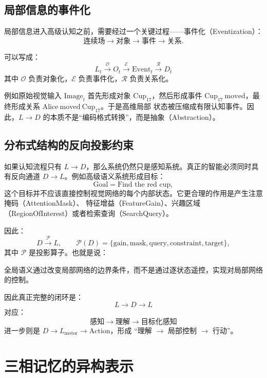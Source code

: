 \subsection{局部信息的事件化}

局部信息进入高级认知之前，需要经过一个关键过程——事件化（Eventization）：
\[
\text{连续场}\rightarrow\text{对象}\rightarrow\text{事件}\rightarrow\text{关系}.
\]

可以写成：
\[
L_t
\xrightarrow{\mathcal O}
O_t
\xrightarrow{\mathcal E}
\mathrm{Event}_t
\xrightarrow{\mathcal R}
D_t
\]
其中 $\mathcal O$ 负责对象化，$\mathcal E$ 负责事件化，$\mathcal R$ 负责关系化。

例如原始视觉输入 $\mathrm{Image}_t$ 首先形成对象 $\mathrm{Cup}_{17}$，然后形成事件
$\mathrm{Cup}_{17}\ \mathrm{moved}$，最终形成关系 $\mathrm{Alice\ moved\ Cup}_{17}$。于是高维局部
状态被压缩成有限认知事件。因此，$L\rightarrow D$ 的本质不是“编码格式转换”，而是抽象（Abstraction）。

\subsection{分布式结构的反向投影约束}

如果认知流程只有 $L\rightarrow D$，那么系统仍然只是感知系统。真正的智能必须同时具有反向通道
$D\rightarrow L$。例如高级语义系统形成目标：
\[
\mathrm{Goal}=\text{Find the red cup},
\]
这个目标并不应该直接控制视觉网络的每个内部状态。它更合理的作用是产生注意掩码（AttentionMask）、
特征增益（FeatureGain）、兴趣区域（RegionOfInterest）或者检索查询（SearchQuery）。

因此：
\[
D\xrightarrow{\mathcal P}L,
\qquad
\mathcal P(D)=\{\mathrm{gain},\mathrm{mask},\mathrm{query},\mathrm{constraint},\mathrm{target}\},
\]
其中 $\mathcal P$ 是投影算子。也就是说：

\begin{statementbox}
全局语义通过改变局部网络的边界条件，而不是通过逐状态遥控，实现对局部网络的控制。
\end{statementbox}

因此真正完整的闭环是：
\[
\boxed{
L\rightarrow D\rightarrow L
}
\]
对应：
\[
\boxed{
\text{感知}\rightarrow\text{理解}\rightarrow\text{目标化感知}
}
\]
进一步则是 $D\rightarrow L_{\mathrm{motor}}\rightarrow\mathrm{Action}$，形成
“理解 $\rightarrow$ 局部控制 $\rightarrow$ 行动”。

\section{三相记忆的异构表示}

